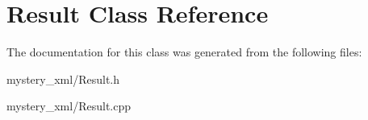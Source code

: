 \hypertarget{classResult}{
\section{Result Class Reference}
\label{classResult}
}


The documentation for this class was generated from the following files:\begin{DoxyCompactItemize}
\item 
mystery\_\-xml/Result.h\item 
mystery\_\-xml/Result.cpp\end{DoxyCompactItemize}
